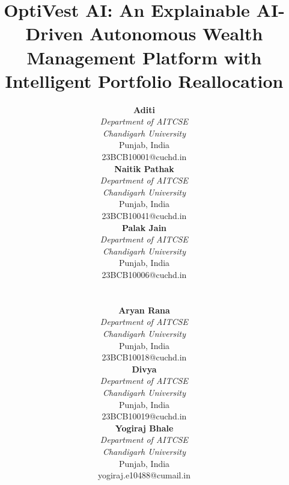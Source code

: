 \documentclass[conference]{IEEEtran}
\begin{document}
\title{OptiVest AI: An Explainable AI-Driven Autonomous Wealth
Management Platform with Intelligent Portfolio Reallocation}

\author{
\parbox{0.3\textwidth}{\centering
\textbf{Aditi}\\
\textit{Department of AITCSE}\\
\textit{Chandigarh University}\\
Punjab, India\\
23BCB10001@cuchd.in}
\hfill
\parbox{0.3\textwidth}{\centering
\textbf{Naitik Pathak}\\
\textit{Department of AITCSE}\\
\textit{Chandigarh University}\\
Punjab, India\\
23BCB10041@cuchd.in}
\hfill
\parbox{0.3\textwidth}{\centering
\textbf{Palak Jain}\\
\textit{Department of AITCSE}\\
\textit{Chandigarh University}\\
Punjab, India\\
23BCB10006@cuchd.in}
\\[1.5em]
\parbox{0.3\textwidth}{\centering
\textbf{Aryan Rana}\\
\textit{Department of AITCSE}\\
\textit{Chandigarh University}\\
Punjab, India\\
23BCB10018@cuchd.in}
\hfill
\parbox{0.3\textwidth}{\centering
\textbf{Divya}\\
\textit{Department of AITCSE}\\
\textit{Chandigarh University}\\
Punjab, India\\
23BCB10019@cuchd.in}
\hfill
\parbox{0.3\textwidth}{\centering
\textbf{Yogiraj Bhale}\\
\textit{Department of AITCSE}\\
\textit{Chandigarh University}\\
Punjab, India\\
yogiraj.e10488@cumail.in}
}

\maketitle
\end{document}
